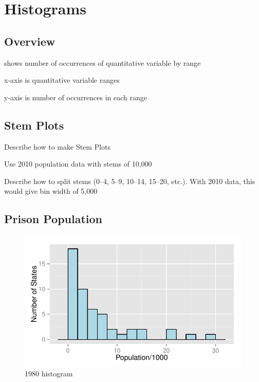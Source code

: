 \documentclass[letterpaper, landscape]{article}
\begin{document}
  \newpage

  \section{Histograms}

  \subsection{Overview}
  \begin{itemize*}
    \item shows number of occurrences of quantitative variable by range
    \item x-axis is quantitative variable ranges
    \item y-axis is number of occurrences in each range
  \end{itemize*}

  \subsection{Stem Plots}
  \begin{itemize*}
    \item Describe how to make Stem Plots
    \item Use 2010 population data with stems of 10,000
    \item Describe how to split stems (0--4, 5--9, 10--14, 15--20, etc.).  With
      2010 data, this would give bin width of 5,000
  \end{itemize*}

  \subsection{Prison Population}

  \begin{figure}[H]
    \centering
    \includegraphics[scale = 0.8]{figures/population_histogram_1980.pdf}
    \caption{1980 histogram}
  \end{figure}
\end{document}

